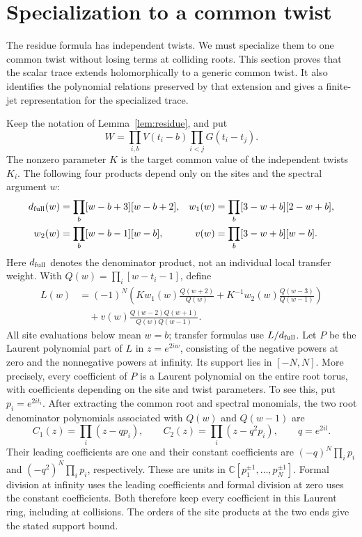 \section{Specialization to a common twist}\label{sec:common-twist}

The residue formula has independent twists. We must specialize them to one common twist without losing terms at colliding roots. This section proves that the scalar trace extends holomorphically to a generic common twist. It also identifies the polynomial relations preserved by that extension and gives a finite-jet representation for the specialized trace.

Keep the notation of Lemma~\ref{lem:residue}, and put
\[
 W=\prod_{i,b}V(t_i-b)\prod_{i<j}G(t_i-t_j).
\]
The nonzero parameter $K$ is the target common value of the independent twists $K_i$. The following four products depend only on the sites and the spectral argument $w$:
\begin{equation}\label{eq:common-twist-products}
\begin{aligned}
 d_{\rm full}(w)&=\prod_b[w-b+3][w-b+2],
 &w_1(w)&=\prod_b[3-w+b][2-w+b],\\
 w_2(w)&=\prod_b[w-b-1][w-b],
 &v(w)&=\prod_b[3-w+b][w-b].
\end{aligned}
\end{equation}
Here $d_{\rm full}$ denotes the denominator product, not an individual local transfer weight. With $Q(w)=\prod_i[w-t_i-1]$, define
\begin{equation}\label{eq:common-twist-L}
\begin{aligned}
 L(w)&=(-1)^N\left(Kw_1(w)\frac{Q(w+2)}{Q(w)}
             +K^{-1}w_2(w)\frac{Q(w-3)}{Q(w-1)}\right)\\
 &\quad+v(w)\frac{Q(w-2)Q(w+1)}{Q(w)Q(w-1)}.
\end{aligned}
\end{equation}
All site evaluations below mean \(w=b\); transfer formulas use
\(L/d_{\rm full}\). Let \(P\) be the Laurent polynomial part of \(L\)
in \(z=e^{2iw}\), consisting of the negative powers at zero and the
nonnegative powers at infinity. Its support lies in \([-N,N]\).
More precisely, every coefficient of \(P\) is a Laurent polynomial
on the entire root torus, with coefficients depending on the site
and twist parameters. To see this, put \(p_i=e^{2it_i}\).
After extracting the common root and spectral monomials, the two
root denominator polynomials associated with \(Q(w)\) and \(Q(w-1)\)
are
\[
 C_1(z)=\prod_i(z-q p_i),\qquad
 C_2(z)=\prod_i(z-q^2p_i),\qquad q=e^{2il}.
\]
Their leading coefficients are one and their constant coefficients
are \((-q)^N\prod_i p_i\) and \((-q^2)^N\prod_i p_i\), respectively.
These are units in \(\mathbb C[p_1^{\pm1},\ldots,p_N^{\pm1}]\).
Formal division at infinity uses the leading coefficients and
formal division at zero uses the constant coefficients. Both
therefore keep every coefficient in this Laurent ring, including
at collisions. The orders of the site products at the two ends
give the stated support bound.

